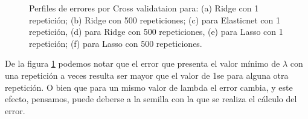 \documentclass[11pt]{article}
\begin{document}
\begin{figure}
 \hfill
    \caption{Perfiles de errores por Cross validataion para: (a) Ridge con 1 repetición; (b) Ridge con 500 repeticiones; (c) para Elasticnet con 1 repetición, (d) para Ridge con 500 repeticiones, (e) para Lasso con 1 repetición; (f) para Lasso con 500 repeticiones.}\label{fig:MS}
\end{figure}

De la figura \ref{fig:MS} podemos notar que el error que presenta el valor mínimo de $\lambda$ con una repetición a veces resulta ser mayor que el valor de 1se para alguna otra repetición. O bien que para un mismo valor de lambda el error cambia, y este efecto, pensamos, puede deberse a la semilla con la que se realiza el cálculo del error.

\end{document}
